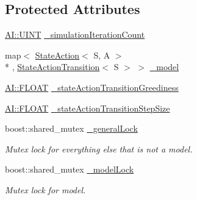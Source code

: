 \subsection*{Protected Attributes}
\begin{DoxyCompactItemize}
\item 
\hyperlink{namespaceAI_ab6e14dc1e659854858a87e511f1439ec}{A\-I\-::\-U\-I\-N\-T} \hyperlink{classAI_1_1Algorithm_1_1DynaQBase_a3d375c3e01c7cc8a30c92109780adb9b}{\-\_\-simulation\-Iteration\-Count}
\item 
map$<$ \hyperlink{classAI_1_1StateAction}{State\-Action}$<$ S, A $>$\\*
, \hyperlink{classAI_1_1Algorithm_1_1StateActionTransition}{State\-Action\-Transition}$<$ S $>$ $>$ \hyperlink{classAI_1_1Algorithm_1_1DynaQBase_a65878fdff793c8b4bef59bb128e19bd8}{\-\_\-model}
\item 
\hyperlink{namespaceAI_a41b74884a20833db653dded3918e05c3}{A\-I\-::\-F\-L\-O\-A\-T} \hyperlink{classAI_1_1Algorithm_1_1DynaQBase_ae3f83dbeea191fc8bdcd518a2e54af97}{\-\_\-state\-Action\-Transition\-Greediness}
\item 
\hyperlink{namespaceAI_a41b74884a20833db653dded3918e05c3}{A\-I\-::\-F\-L\-O\-A\-T} \hyperlink{classAI_1_1Algorithm_1_1DynaQBase_a1fd132ae0aeb356a891e5b81bf218338}{\-\_\-state\-Action\-Transition\-Step\-Size}
\item 
\hypertarget{classAI_1_1Algorithm_1_1DynaQBase_adc3615604882454399863291f73b8734}{boost\-::shared\-\_\-mutex \hyperlink{classAI_1_1Algorithm_1_1DynaQBase_adc3615604882454399863291f73b8734}{\-\_\-general\-Lock}}\label{classAI_1_1Algorithm_1_1DynaQBase_adc3615604882454399863291f73b8734}

\begin{DoxyCompactList}\small\item\em Mutex lock for everything else that is not a model. \end{DoxyCompactList}\item 
\hypertarget{classAI_1_1Algorithm_1_1DynaQBase_ab166bd02d02f17c76a7626372c649849}{boost\-::shared\-\_\-mutex \hyperlink{classAI_1_1Algorithm_1_1DynaQBase_ab166bd02d02f17c76a7626372c649849}{\-\_\-model\-Lock}}\label{classAI_1_1Algorithm_1_1DynaQBase_ab166bd02d02f17c76a7626372c649849}

\begin{DoxyCompactList}\small\item\em Mutex lock for model. \end{DoxyCompactList}\end{DoxyCompactItemize}


